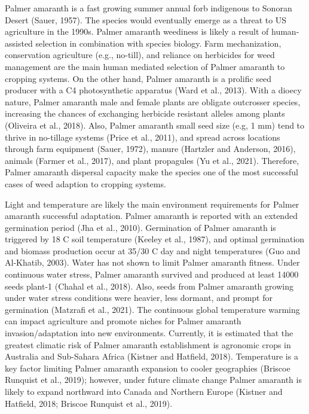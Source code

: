 \documentclass[utf8]{frontiersSCNS}
\begin{document}
Palmer amaranth is a fast growing summer annual forb indigenous to
Sonoran Desert (Sauer, 1957). The species would eventually emerge as a
threat to US agriculture in the 1990s. Palmer amaranth weediness is
likely a result of human-assisted selection in combination with species
biology. Farm mechanization, conservation agriculture (e.g., no-till),
and reliance on herbicides for weed management are the main human
mediated selection of Palmer amaranth to cropping systems. On the other
hand, Palmer amaranth is a prolific seed producer with a C4
photosynthetic apparatus (Ward et al., 2013). With a dioecy nature,
Palmer amaranth male and female plants are obligate outcrosser species,
increasing the chances of exchanging herbicide resistant alleles among
plants (Oliveira et al., 2018). Also, Palmer amaranth small seed size
(e.g, 1 mm) tend to thrive in no-tillage systems (Price et al., 2011),
and spread across locations through farm equipment (Sauer, 1972), manure
(Hartzler and Anderson, 2016), animals (Farmer et al., 2017), and plant
propagules (Yu et al., 2021). Therefore, Palmer amaranth dispersal
capacity make the species one of the most successful cases of weed
adaption to cropping systems.

Light and temperature are likely the main environment requirements for
Palmer amaranth successful adaptation. Palmer amaranth is reported with
an extended germination period (Jha et al., 2010). Germination of Palmer
amaranth is triggered by 18 C soil temperature (Keeley et al., 1987),
and optimal germination and biomass production occur at 35/30 C day and
night temperatures (Guo and Al-Khatib, 2003). Water has not shown to
limit Palmer amaranth fitness. Under continuous water stress, Palmer
amaranth survived and produced at least 14000 seeds plant-1 (Chahal et
al., 2018). Also, seeds from Palmer amaranth growing under water stress
conditions were heavier, less dormant, and prompt for germination
(Matzrafi et al., 2021). The continuous global temperature warming can
impact agriculture and promote niches for Palmer amaranth
invasion/adaptation into new environments. Currently, it is estimated
that the greatest climatic risk of Palmer amaranth establishment is
agronomic crops in Australia and Sub-Sahara Africa (Kistner and
Hatfield, 2018). Temperature is a key factor limiting Palmer amaranth
expansion to cooler geographies (Briscoe Runquist et al., 2019);
however, under future climate change Palmer amaranth is likely to expand
northward into Canada and Northern Europe (Kistner and Hatfield, 2018;
Briscoe Runquist et al., 2019).
\end{document}

